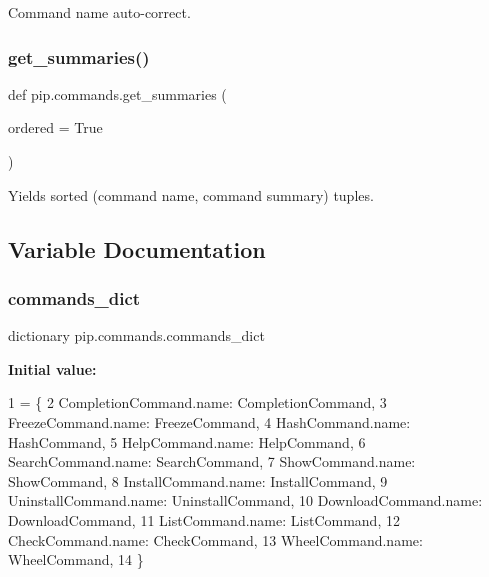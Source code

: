 \begin{DoxyVerb}Command name auto-correct.\end{DoxyVerb}
 \mbox{\label{namespacepip_1_1commands_ae39a8b6d0749edb37df29219a2225246}} 
\subsubsection{\texorpdfstring{get\+\_\+summaries()}{get\_summaries()}}
{\footnotesize\ttfamily def pip.\+commands.\+get\+\_\+summaries (\begin{DoxyParamCaption}\item[{}]{ordered = {\ttfamily True} }\end{DoxyParamCaption})}

\begin{DoxyVerb}Yields sorted (command name, command summary) tuples.\end{DoxyVerb}
 

\subsection{Variable Documentation}
\mbox{\label{namespacepip_1_1commands_abdfcfe4fe28aa0e9a57adf653463e19d}} 
\subsubsection{\texorpdfstring{commands\+\_\+dict}{commands\_dict}}
{\footnotesize\ttfamily dictionary pip.\+commands.\+commands\+\_\+dict}

{\bfseries Initial value\+:}
\begin{DoxyCode}
1 =  \{
2     CompletionCommand.name: CompletionCommand,
3     FreezeCommand.name: FreezeCommand,
4     HashCommand.name: HashCommand,
5     HelpCommand.name: HelpCommand,
6     SearchCommand.name: SearchCommand,
7     ShowCommand.name: ShowCommand,
8     InstallCommand.name: InstallCommand,
9     UninstallCommand.name: UninstallCommand,
10     DownloadCommand.name: DownloadCommand,
11     ListCommand.name: ListCommand,
12     CheckCommand.name: CheckCommand,
13     WheelCommand.name: WheelCommand,
14 \}
\end{DoxyCode}
\mbox{\label{namespacepip_1_1commands_ae15a32dbe7607bb28041e940fd0e9107}} 
